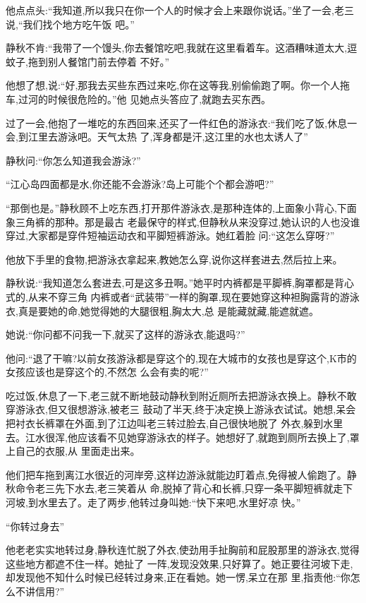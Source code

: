 ﻿\documentclass[12pt]{article}
\begin{document}
他点点头:``我知道,所以我只在你一个人的时候才会上来跟你说话。''坐了一会,老三说,``我们找个地方吃午饭
吧。''

静秋不肯:``我带了一个馒头,你去餐馆吃吧,我就在这里看着车。这酒糟味道太大,逗蚊子,拖到别人餐馆门前去停着
不好。''

他想了想,说:``好,那我去买些东西过来吃,你在这等我,别偷偷跑了啊。你一个人拖车,过河的时候很危险的。''他
见她点头答应了,就跑去买东西。

过了一会,他抱了一堆吃的东西回来,还买了一件红色的游泳衣:``我们吃了饭,休息一会,到江里去游泳吧。天气太热
了,浑身都是汗,这江里的水也太诱人了\myrule ''

静秋问:``你怎么知道我会游泳?''

``江心岛四面都是水,你还能不会游泳?岛上可能个个都会游吧?''

``那倒也是。''静秋顾不上吃东西,打开那件游泳衣,是那种连体的,上面象小背心,下面象三角裤的那种。那是最古
老最保守的样式,但静秋从来没穿过,她认识的人也没谁穿过,大家都是穿件短袖运动衣和平脚短裤游泳。她红着脸
问:``这怎么穿呀?''

他放下手里的食物,把游泳衣拿起来,教她怎么穿,说你这样套进去,然后拉上来。

静秋说:``我知道怎么套进去,可是这多\myrule 丑啊。''她平时内裤都是平脚裤,胸罩都是背心式的,从来不穿三角
内裤或者``武装带''一样的胸罩,现在要她穿这种袒胸露背的游泳衣,真是要她的命,她觉得她的大腿很粗,胸太大,总
是能藏就藏,能遮就遮。

她说:``你问都不问我一下,就买了这样的游泳衣,能退吗?''

他问:``退了干嘛?以前女孩游泳都是穿这个的,现在大城市的女孩也是穿这个,K市的女孩应该也是穿这个的,不然怎
么会有卖的呢?''

吃过饭,休息了一下,老三就不断地鼓动静秋到附近厕所去把游泳衣换上。静秋不敢穿游泳衣,但又很想游泳,被老三
鼓动了半天,终于决定换上游泳衣试试。她想,呆会把衬衣长裤罩在外面,到了江边叫老三转过脸去,自己很快地脱了
外衣,躲到水里去。江水很浑,他应该看不见她穿游泳衣的样子。她想好了,就跑到厕所去换上了,罩上自己的衣服,从
里面走出来。

他们把车拖到离江水很近的河岸旁,这样边游泳就能边盯着点,免得被人偷跑了。静秋命令老三先下水去,老三笑着从
命,脱掉了背心和长裤,只穿一条平脚短裤就走下河坡,到水里去了。走了两步,他转过身叫她:``快下来吧,水里好凉
快。''

``你转过身去\myrule ''

他老老实实地转过身,静秋连忙脱了外衣,使劲用手扯胸前和屁股那里的游泳衣,觉得这些地方都遮不住一样。她扯了
一阵,发现没效果,只好算了。她正要往河坡下走,却发现他不知什么时候已经转过身来,正在看她。她一愣,呆立在那
里,指责他:``你\myrule 怎么不讲信用?''
\end{document}
